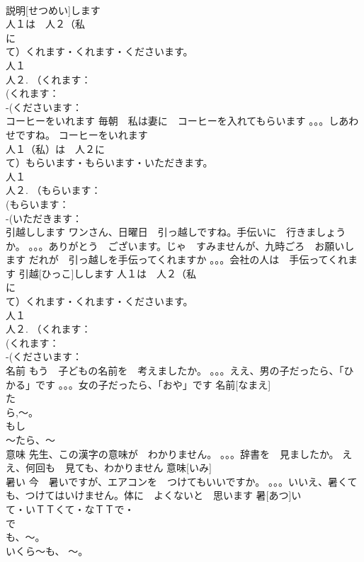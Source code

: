 \documentclass[8pt]{extreport}
\begin{document}
\begin{CJK}{UTF8}{min}
\\	説明[せつめい]します			
\\	人１は　人２（私
\\	に　
\\	て）くれます・くれます・くださいます。
\\	人１
\\	人２. （くれます：
\\	(くれます：
\\	-(くださいます：
\\	コーヒーをいれます	毎朝　私は妻に　コーヒーを入れてもらいます 。。。しあわせですね。	コーヒーをいれます			
\\	人１（私）は　人２に　
\\	て）もらいます・もらいます・いただきます。
\\	人１
\\	人２. （もらいます：
\\	(もらいます：
\\	-(いただきます：
\\	引越しします	ワンさん、日曜日　引っ越しですね。手伝いに　行きましょうか。 。。。ありがとう　ございます。じゃ　すみませんが、九時ごろ　お願いします だれが　引っ越しを手伝ってくれますか 。。。会社の人は　手伝ってくれます	引越[ひっこ]しします				人１は　人２（私
\\	に　
\\	て）くれます・くれます・くださいます。
\\	人１
\\	人２. （くれます：
\\	(くれます：
\\	-(くださいます：
\\	名前	もう　子どもの名前を　考えましたか。 。。。ええ、男の子だったら、「ひかる」です 。。。女の子だったら、「おや」です	名前[なまえ]				
\\	た
\\	ら,～。
\\	もし
\\	～たら、～	
\\	意味	先生、この漢字の意味が　わかりません。 。。。辞書を　見ましたか。 ええ、何回も　見ても、わかりません	意味[いみ]			
\\	暑い	今　暑いですが、エアコンを　つけてもいいですか。 。。。いいえ、暑くても、つけてはいけません。体に　よくないと　思います	暑[あつ]い				
\\	て・いＴＴくて・なＴＴで・
\\	で
\\	も、～。
\\	いくら～も、 ～。

\end{CJK}
\end{document}
